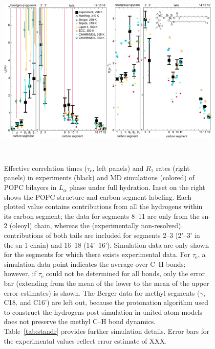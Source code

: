 \documentclass[journal=jcisd8,manuscript=article,layout=twocolumn]{achemso}
\begin{document}
\begin{figure}[!ht]
\centering
\includegraphics[width=\textwidth]{./figures/normalcond_2020_3.pdf}
\caption{Effective correlation times ($\tau_\mathrm{e}$, left panels) and $R_{1}$ rates (right panels) in experiments (black) and MD simulations (colored) of POPC bilayers in $L_{\alpha}$ phase under full hydration.
Inset on the right shows the POPC structure and carbon segment labeling.
Each plotted value contains contributions from all the hydrogens within its carbon segment; the data for segments 8--11 are only from the sn-2 (oleoyl) chain, whereas the (experimentally non-resolved) contributions of both tails are included for segments 2--3 (2'--3' in the sn-1 chain) and 16--18 (14'--16').
%
Simulation data are only shown for the segments for which there exists experimental data.
%
For $\tau_\mathrm{e}$,
a simulation data point indicates the average over C--H bonds; however,
if $\tau_\mathrm{e}$ could not be determined for all bonds, only the error bar
(extending from the mean of the lower to the mean of the upper error estimates) is shown.
%
The Berger data for methyl segments ($\gamma$, C18, and C16') are left out, because the protonation algorithm used to construct the hydrogens post-simulation in united atom models does not preserve the methyl C--H bond dynamics.
%
Table~\ref{tab:standr} provides further simulation details.
%
Error bars for the experimental values reflect error estimate of {\color{red}XXX}.
}
\label{fig:teff_R1}

\\

\end{figure}
\end{document}
